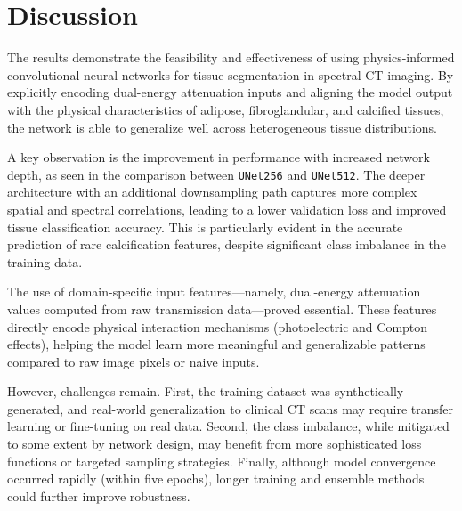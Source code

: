 \section{Discussion}\label{sec:discussion}

The results demonstrate the feasibility and effectiveness of using physics-informed convolutional neural networks for 
tissue segmentation in spectral CT imaging. By explicitly encoding dual-energy attenuation inputs and aligning the model 
output with the physical characteristics of adipose, fibroglandular, and calcified tissues, the network is able to 
generalize well across heterogeneous tissue distributions.

A key observation is the improvement in performance with increased network depth, as seen in the comparison between 
\texttt{UNet256} and \texttt{UNet512}. The deeper architecture with an additional downsampling path captures more 
complex spatial and spectral correlations, leading to a lower validation loss and improved tissue classification 
accuracy. This is particularly evident in the accurate prediction of rare calcification features, despite significant 
class imbalance in the training data.

The use of domain-specific input features—namely, dual-energy attenuation values computed from raw transmission 
data—proved essential. These features directly encode physical interaction mechanisms (photoelectric and Compton 
effects), helping the model learn more meaningful and generalizable patterns compared to raw image pixels or naive 
inputs.

However, challenges remain. First, the training dataset was synthetically generated, and real-world generalization to 
clinical CT scans may require transfer learning or fine-tuning on real data. Second, the class imbalance, while 
mitigated to some extent by network design, may benefit from more sophisticated loss functions or targeted sampling 
strategies. Finally, although model convergence occurred rapidly (within five epochs), longer training and ensemble 
methods could further improve robustness.

